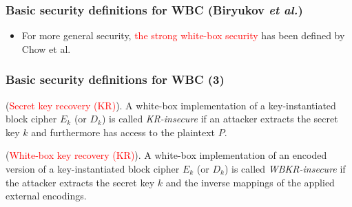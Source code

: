 \documentclass[aspectratio=169,xcolor=dvipsnames]{beamer}
\begin{document}
\frame
{
\frametitle{Basic security definitions for WBC (Biryukov \textit{et al.})}
\begin{itemize}
\item For more general security, \textcolor{red}{the strong white-box security} has been defined by Chow et al.
\end{itemize}

\begin{center}
\end{center}
}

\frame
{
\frametitle{Basic security definitions for WBC (3)}
\begin{definition}(\textcolor{red}{Secret key recovery (KR)}). A white-box implementation of a key-instantiated block cipher $E_{k}$ (or $D_{k}$) is called \textit{KR-insecure} if an attacker extracts the secret key $k$ and furthermore has access to the plaintext $P$.
\end{definition}

\begin{definition}
(\textcolor{red}{White-box key recovery (KR)}). A white-box implementation of an encoded version of a key-instantiated block cipher $E_{k}$ (or $D_{k}$) is called \textit{WBKR-insecure} if the attacker extracts the secret key $k$ and the inverse mappings of the applied external encodings.
\end{definition}
}
\end{document}
